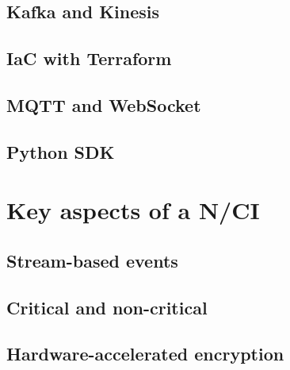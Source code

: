 \subsection{Kafka and Kinesis}
\label{chapter4-kafka-aws-kinesis}

\subsection{IaC with Terraform}
\label{chapter4-iac-with-terraform}

\subsection{MQTT and WebSocket}
\label{chapter4-mqtt-and-websocket}

\subsection{Python SDK}
\label{chapter4-python-sdk}

\section{Key aspects of a N/CI}
\label{chapter4-key-aspects}

\subsection{Stream-based events}
\label{chapter4-stream-based-events}

\subsection{Critical and non-critical}
\label{chapter4-critical-and-non-critical}

\subsection{Hardware-accelerated encryption}
\label{chapter4-hardware-accelerated-encryption}

